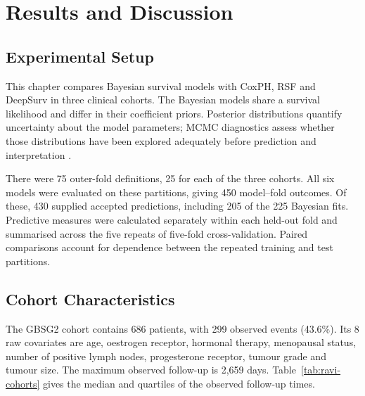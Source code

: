\chapter{Results and Discussion}\label{results-and-discussion}

\section{Experimental Setup}\label{experimental-setup}

This chapter compares Bayesian survival models with CoxPH, RSF and DeepSurv in three clinical cohorts. The Bayesian models share a survival likelihood and differ in their coefficient priors. Posterior distributions quantify uncertainty about the model parameters; MCMC diagnostics assess whether those distributions have been explored adequately before prediction and interpretation \cite{ref22}.

There were 75 outer-fold definitions, 25 for each of the three cohorts. All six models were evaluated on these partitions, giving 450 model--fold outcomes. Of these, 430 supplied accepted predictions, including 205 of the 225 Bayesian fits. Predictive measures were calculated separately within each held-out fold and summarised across the five repeats of five-fold cross-validation. Paired comparisons account for dependence between the repeated training and test partitions.

\section{Cohort Characteristics}\label{cohort-characteristics}

The GBSG2 cohort contains 686 patients, with 299 observed events (43.6\%). Its 8 raw covariates are age, oestrogen receptor, hormonal therapy, menopausal status, number of positive lymph nodes, progesterone receptor, tumour grade and tumour size. The maximum observed follow-up is 2,659 days. Table~\ref{tab:ravi-cohorts} gives the median and quartiles of the observed follow-up times.

